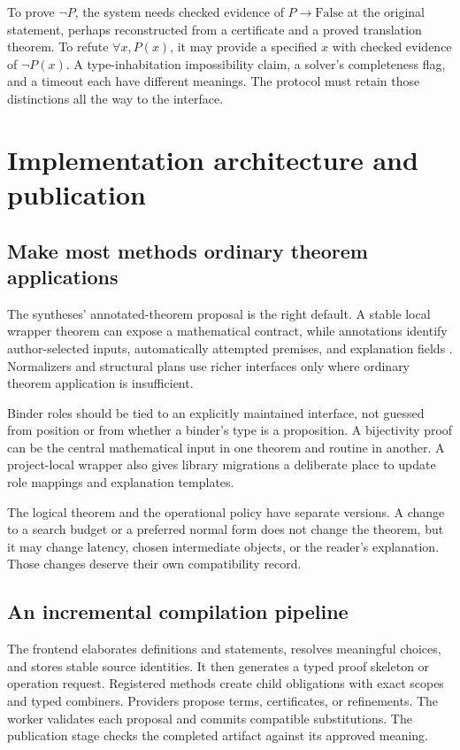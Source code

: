 \documentclass[11pt,a4paper]{article}
\theoremstyle{definition}
\begin{document}
To prove $\neg P$, the system needs checked evidence of $P\to\mathrm{False}$
at the original statement, perhaps reconstructed from a certificate and a proved
translation theorem. To refute $\forall x, P(x)$, it may provide a specified
$x$ with checked evidence of $\neg P(x)$. A type-inhabitation impossibility
claim, a solver's completeness flag, and a timeout each have different meanings.
The protocol must retain those distinctions all the way to the interface.

\section{Implementation architecture and publication}
\label{sec:implementation}
\subsection{Make most methods ordinary theorem applications}
The syntheses' annotated-theorem proposal is the right default. A stable local
wrapper theorem can expose a mathematical contract, while annotations identify
author-selected inputs, automatically attempted premises, and explanation fields
\cite{syn-a,syn-b}. Normalizers and structural plans use richer interfaces only
where ordinary theorem application is insufficient.

Binder roles should be tied to an explicitly maintained interface, not guessed
from position or from whether a binder's type is a proposition. A bijectivity
proof can be the central mathematical input in one theorem and routine in another.
A project-local wrapper also gives library migrations a deliberate place to
update role mappings and explanation templates.

The logical theorem and the operational policy have separate versions. A change
to a search budget or a preferred normal form does not change the theorem, but
it may change latency, chosen intermediate objects, or the reader's explanation.
Those changes deserve their own compatibility record.

\subsection{An incremental compilation pipeline}
The frontend elaborates definitions and statements, resolves meaningful choices,
and stores stable source identities. It then generates a typed proof skeleton
or operation request. Registered methods create child obligations with exact
scopes and typed combiners. Providers propose terms, certificates, or refinements.
The worker validates each proposal and commits compatible substitutions. The
publication stage checks the completed artifact against its approved meaning.
\end{document}
